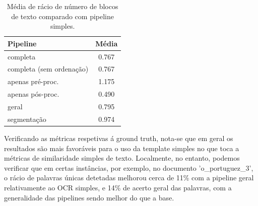 \begin{table}[H]
	\centering
	\small
	\begin{tabular}{|l|c|}
		\hline
		\textbf{Pipeline} & \textbf{Média} \\ \hline
		completa & 0.767 				   \\ \hline
		completa (sem ordenação) & 0.767   \\ \hline
		apenas pré-proc. & 1.175 		   \\ \hline
		apenas pós-proc. & 0.490 		   \\ \hline
		geral & 0.795 					   \\ \hline
		segmentação & 0.974 			   \\ \hline
	\end{tabular}
	\caption{Média de rácio de número de blocos de texto comparado com pipeline simples.}
\end{table}




Verificando as métricas respetivas á ground truth, nota-se que em geral os resultados são mais favoráveis para o uso da template simples no que toca a métricas de similaridade simples de texto. Localmente, no entanto, podemos verificar que em certas instâncias, por exemplo, no documento 'o\_portuguez\_3', o rácio de palavras únicas detetadas melhorou cerca de 11\% com a pipeline geral relativamente ao OCR simples, e 14\% de acerto geral das palavras, com a generalidade das pipelines sendo melhor do que a base.

